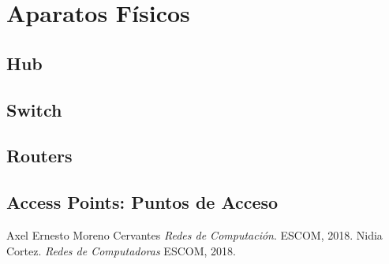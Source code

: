 \documentclass[12pt, fleqn]{report}                             %
\theoremstyle{break}                                            %
\begin{document}
\part{Aparatos Físicos}
\clearpage

    
    \chapter{Hub}


    \chapter{Switch}


    \chapter{Routers}



    \chapter{Access Points: Puntos de Acceso}






\begin{thebibliography}{10}

        Axel Ernesto Moreno Cervantes
        \textit{Redes de Computación}. 
        ESCOM, 2018.
        Nidia Cortez.
        \textit{Redes de Computadoras}
        ESCOM, 2018.

\end{thebibliography}
\end{document}
